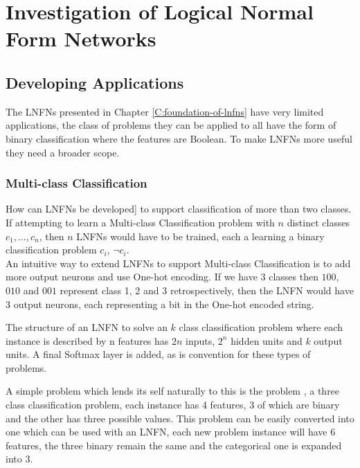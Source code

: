 \chapter{Investigation of Logical Normal Form Networks} \label{C:investigation-of-lnfns}
\section{Developing Applications} \label{sec:developing-applications}
The LNFNs presented in Chapter \ref{C:foundation-of-lnfns} have very limited applications, the class of problems they can be applied to all have the form of binary classification where the features are Boolean. To make LNFNs more useful they need a broader scope.

\subsection{Multi-class Classification}
How can LNFNs be developed] to support classification of more than two classes. If attempting to learn a Multi-class Classification problem with $n$ distinct classes $c_1, ..., c_n$, then $n$ LNFNs would have to be trained, each a learning a binary classification problem $c_i$, $\lnot c_i$.\\

An intuitive way to extend LNFNs to support Multi-class Classification is to add more output neurons and use One-hot encoding. If we have 3 classes then $100$, $010$ and $001$ represent class 1, 2 and 3 retrospectively, then the LNFN would have 3 output neurons, each representing a bit in the One-hot encoded string.\\

\begin{definition}
	The structure of an LNFN to solve an $k$ class classification problem where each instance is described by n features has $2n$ inputs, $2^n$ hidden units and $k$ output units. A final Softmax layer is added, as is convention for these types of problems.
\end{definition}

A simple problem which lends its self naturally to this is the  problem \cite{Lichman:2013}, a three class classification problem, each instance has 4 features, 3 of which are binary and the other has three possible values. This problem can be easily converted into one which can be used with an LNFN, each new problem instance will have 6 features, the three binary remain the same and the categorical one is expanded into 3.\\

